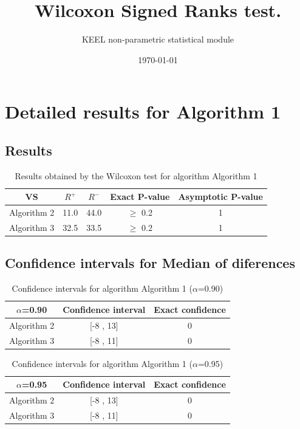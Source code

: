 \documentclass[a4paper,10pt]{article}
\title{Wilcoxon Signed Ranks test.}
\date{\today}
\author{KEEL non-parametric statistical module}
\begin{document}
\pagestyle{empty}
\maketitle
\thispagestyle{empty}



\section{Detailed results for Algorithm 1}


\subsection{Results}

\begin{table}[!htp]
\centering\small
\begin{tabular}{
|c|c|c|c|c|}
\hline
 VS & $R^{+}$ & $R^{-}$ & Exact P-value & Asymptotic P-value \\ \hline 
Algorithm 2 & 11.0 & 44.0 & $\geq$ 0.2 & 1\\ \hline 
Algorithm 3 & 32.5 & 33.5 & $\geq$ 0.2 & 1\\ \hline 

\end{tabular}
\caption{Results obtained by the Wilcoxon test for algorithm Algorithm 1}
\end{table}

\subsection{Confidence intervals for Median of diferences}

\begin{table}[!htp]
\centering\small
\begin{tabular}{
|c|c|c|}
\hline
 $\alpha$=0.90 & Confidence interval & Exact confidence \\ \hline 
Algorithm 2 & [-8 , 13] & 0\\ \hline 
Algorithm 3 & [-8 , 11] & 0\\ \hline 

\end{tabular}
\caption{Confidence intervals for algorithm Algorithm 1 ($\alpha$=0.90)}
\end{table}
\begin{table}[!htp]
\centering\small
\begin{tabular}{
|c|c|c|}
\hline
 $\alpha$=0.95 & Confidence interval & Exact confidence \\ \hline 
Algorithm 2 & [-8 , 13] & 0\\ \hline 
Algorithm 3 & [-8 , 11] & 0\\ \hline 

\end{tabular}
\caption{Confidence intervals for algorithm Algorithm 1 ($\alpha$=0.95)}
\end{table}
\end{document}
